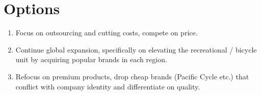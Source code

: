 \chapter*{Options}


\begin{enumerate}
  \item Focus on outsourcing and cutting costs, compete on price.
  \item Continue global expansion, specifically on elevating the recreational / bicycle unit by acquiring popular brands in each region.
  \item Refocus on premium products, drop cheap brands (Pacific Cycle etc.) that conflict with company identity and differentiate on quality.
\end{enumerate}






\endgroup			

\vfill

